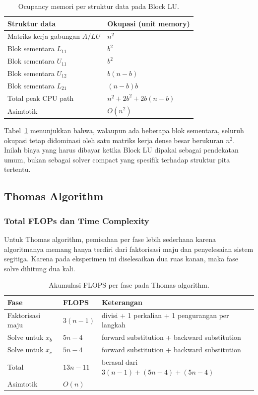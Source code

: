 \documentclass[12pt,a4paper]{article}
\begin{document}
\begin{table}[h]
\centering
\caption{Ocupancy memori per struktur data pada Block LU.}
\label{tab:blocklu-memory}
\begin{tabular}{ll}
\toprule
Struktur data & Okupasi (unit memory) \\
\midrule
Matriks kerja gabungan $A/LU$ & $n^2$ \\
Blok sementara $L_{11}$ & $b^2$ \\
Blok sementara $U_{11}$ & $b^2$ \\
Blok sementara $U_{12}$ & $b(n-b)$ \\
Blok sementara $L_{21}$ & $(n-b)b$ \\
\midrule
Total peak CPU path & $n^2 + 2b^2 + 2b(n-b)$ \\
Asimtotik & $O(n^2)$ \\
\bottomrule
\end{tabular}
\end{table}

Tabel~\ref{tab:blocklu-memory} menunjukkan bahwa, walaupun ada beberapa blok sementara, seluruh okupasi tetap didominasi oleh satu matriks kerja dense besar berukuran $n^2$. Inilah biaya yang harus dibayar ketika Block LU dipakai sebagai pendekatan umum, bukan sebagai solver compact yang spesifik terhadap struktur pita tertentu.

\subsection{Thomas Algorithm}
\subsubsection*{Total FLOPs dan Time Complexity}
Untuk Thomas algorithm, pemisahan per fase lebih sederhana karena algoritmanya memang hanya terdiri dari faktorisasi maju dan penyelesaian sistem segitiga. Karena pada eksperimen ini diselesaikan dua ruas kanan, maka fase solve dihitung dua kali.

\begin{table}[h]
\centering
\caption{Akumulasi FLOPS per fase pada Thomas algorithm.}
\label{tab:thomas-flops}
\small
\begin{tabularx}{\textwidth}{>{\raggedright\arraybackslash}p{} >{\centering\arraybackslash}p{} >{\raggedright\arraybackslash}X}
\toprule
Fase & FLOPS & Keterangan \\
\midrule
Faktorisasi maju & $3(n-1)$ & 1 divisi + 1 perkalian + 1 pengurangan per langkah \\
Solve untuk $x_b$ & $5n - 4$ & forward substitution + backward substitution \\
Solve untuk $x_c$ & $5n - 4$ & forward substitution + backward substitution \\
\midrule
Total & $13n - 11$ & berasal dari $3(n-1) + (5n-4) + (5n-4)$ \\
Asimtotik & $O(n)$ & \\
\bottomrule
\end{tabularx}
\normalsize
\end{table}
\end{document}
